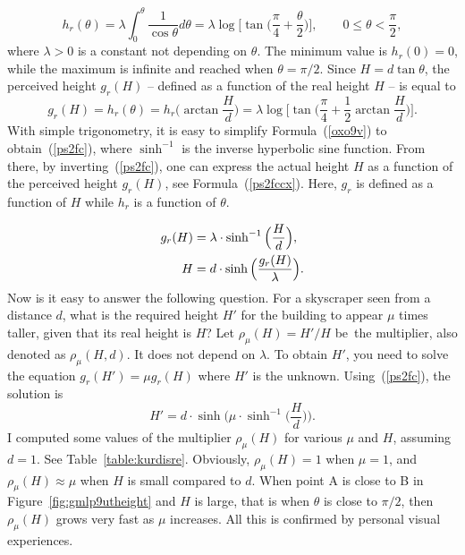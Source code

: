 \documentclass[10pt]{article}
\begin{document}
\begin{equation}
h_r(\theta) = \lambda \int_0^\theta \frac{1}{\cos \theta} d\theta = \lambda
\log\Big[\tan\Big(\frac{\pi}{4}+\frac{\theta}{2}\Big)\Big], \quad\quad 0\leq \theta < \frac{\pi}{2}, \label{fw3kvfjy}
\end{equation}
where $\lambda > 0$ is a constant not depending on $\theta$. The minimum value is $h_r(0) = 0$, while the maximum
 is infinite and reached when $\theta = \pi/2$.  Since $H=d\tan\theta$, the perceived height $g_r(H)$ -- defined as a function of the real height $H$ -- is equal to 
\begin{equation}
g_r(H)=h_r(\theta) = h_r\Big(\arctan\frac{H}{d}\Big) = 
\lambda
\log\Big[\tan\Big(\frac{\pi}{4}+\frac{1}{2}\arctan\frac{H}{d}\Big)\Big]. \label{oxo9v}
\end{equation}
With simple trigonometry, it is easy to simplify Formula~(\ref{oxo9v}) to obtain~(\ref{ps2fc}),
 where $\sinh^{-1}$ is the inverse hyperbolic sine function. From there, by inverting~(\ref{ps2fc}),
 one can express the actual height $H$ as a function of the perceived height $g_r(H)$, see Formula~(\ref{ps2fccx}).
Here, $g_r$ is defined as a function of $H$ while $h_r$ is a function of $\theta$. 

\begin{align}
g_r(H) & = \lambda\cdot\sinh^{-1}\Big(\frac{H}{d}\Big),  \label{ps2fc} \vspace{1ex}\\
H & = d\cdot \sinh\Big(\frac{g_r(H)}{\lambda}\Big). \label{ps2fccx}
\end{align}
Now is it easy to answer the following question. For a skyscraper seen from a distance $d$, what is the required height $H'$ for the building to appear $\mu$ times taller, given that its real height is $H$? 
Let $\rho_\mu(H) = H'/H$ be~the multiplier,
 also denoted as  $\rho_\mu(H, d)$. 
It does not depend on $\lambda$. To obtain $H'$, you need to solve the equation
$g_r(H')=\mu g_r(H)$ where $H'$ is the unknown. Using~(\ref{ps2fc}), the solution is
\begin{equation}
H' = d\cdot \sinh\Big(\mu \cdot \sinh^{-1}\Big(\frac{H}{d}\Big)\Big). \label{turton}
\end{equation}
I computed some values of the multiplier $\rho_\mu(H)$ for various $\mu$ and $H$, assuming
 $d=1$. See Table~\ref{table:kurdisre}. Obviously, $\rho_\mu(H) = 1$ when $\mu=1$, 
and $\rho_\mu(H)\approx\mu$ when $H$ is small compared to $d$.
When point A is close to B in Figure~\ref{fig:gmlp9utheight} and $H$ is large, that is when
$\theta$ is close to $\pi/2$, then $\rho_\mu(H)$ grows very fast as
 $\mu$ increases. All this is confirmed by personal visual experiences.
\vspace{1ex}
\end{document}
